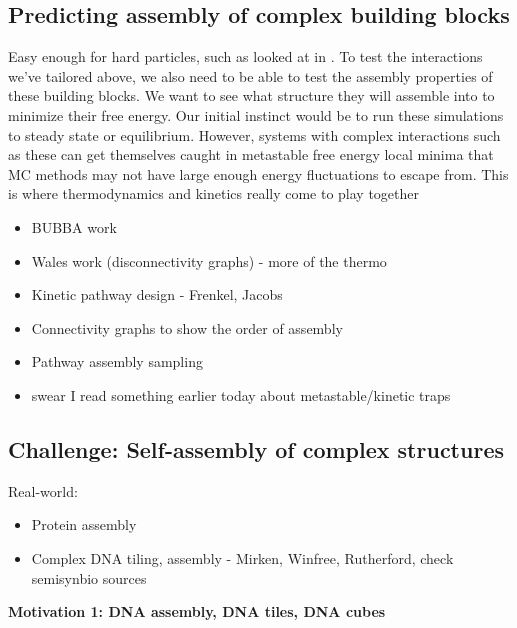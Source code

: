 \subsection{Predicting assembly of complex building blocks}

Easy enough for hard particles, such as looked at in \cite{Damasceno_2012_Science}.
To test the interactions we've tailored above, we also need to be able to test the assembly properties of these building blocks.
We want to see what structure they will assemble into to minimize their free energy.
Our initial instinct would be to run these simulations to steady state or equilibrium.
However, systems with complex interactions such as these can get themselves caught in metastable free energy local minima that MC methods may not have large enough energy fluctuations to escape from.
This is where thermodynamics and kinetics really come to play together

\begin{itemize}
\item BUBBA work
\item Wales work (disconnectivity graphs) - more of the thermo
\item Kinetic pathway design - Frenkel, Jacobs
\item Connectivity graphs to show the order of assembly
\item Pathway assembly sampling
\item swear I read something earlier today about metastable/kinetic traps
\end{itemize}



\subsection{Challenge: Self-assembly of complex structures}

Real-world:
\begin{itemize}
\item Protein assembly
\item Complex DNA tiling, assembly - Mirken, Winfree, Rutherford, check semisynbio sources
\end{itemize}

\textbf{Motivation 1: DNA assembly, DNA tiles, DNA cubes}

